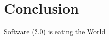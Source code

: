 \section{Conclusion}

\begin{frame}[standout]
    \huge
    Software (2.0) is eating the World
\end{frame}
